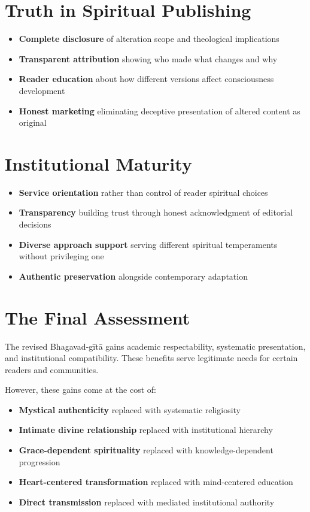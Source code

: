 \documentclass[11pt,twoside]{book}
\begin{document}
\section*{Truth in Spiritual Publishing}
\label{sec:org2d8bc44}
\begin{itemize}
\item \textbf{\textbf{Complete disclosure}} of alteration scope and theological implications
\item \textbf{\textbf{Transparent attribution}} showing who made what changes and why
\item \textbf{\textbf{Reader education}} about how different versions affect consciousness development
\item \textbf{\textbf{Honest marketing}} eliminating deceptive presentation of altered content as original
\end{itemize}
\section*{Institutional Maturity}
\label{sec:orgbd24a91}
\begin{itemize}
\item \textbf{\textbf{Service orientation}} rather than control of reader spiritual choices
\item \textbf{\textbf{Transparency}} building trust through honest acknowledgment of editorial decisions
\item \textbf{\textbf{Diverse approach support}} serving different spiritual temperaments without privileging one
\item \textbf{\textbf{Authentic preservation}} alongside contemporary adaptation
\end{itemize}
\section*{The Final Assessment}
\label{sec:orgb712eae}

The revised Bhagavad-gītā gains academic respectability, systematic presentation, and institutional compatibility. These benefits serve legitimate needs for certain readers and communities.

However, these gains come at the cost of:
\begin{itemize}
\item \textbf{\textbf{Mystical authenticity}} replaced with systematic religiosity
\item \textbf{\textbf{Intimate divine relationship}} replaced with institutional hierarchy
\item \textbf{\textbf{Grace-dependent spirituality}} replaced with knowledge-dependent progression
\item \textbf{\textbf{Heart-centered transformation}} replaced with mind-centered education
\item \textbf{\textbf{Direct transmission}} replaced with mediated institutional authority
\end{itemize}
\end{document}

